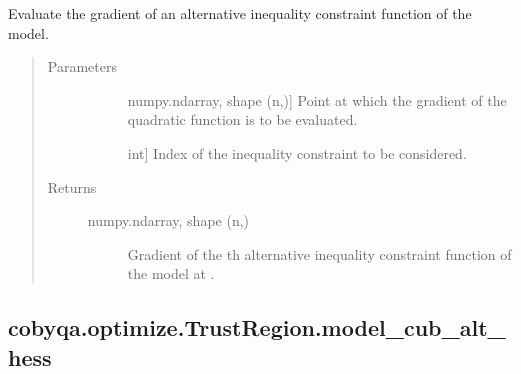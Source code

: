 \documentclass[letterpaper,10pt,english]{sphinxmanual}
\begin{document}
\begin{fulllineitems}
\begin{fulllineitems}
\label{\detokenize{refs/generated/cobyqa.optimize.TrustRegion.model_cub_alt_grad:cobyqa.optimize.TrustRegion.model_cub_alt_grad}}
\sphinxAtStartPar
Evaluate the gradient of an alternative inequality constraint function
of the model.
\begin{quote}\begin{description}
\item[{Parameters}] \leavevmode\begin{description}
\item[{}] \leavevmode{[}numpy.ndarray, shape (n,){]}
\sphinxAtStartPar
Point at which the gradient of the quadratic function is to be
evaluated.

\item[{}] \leavevmode{[}int{]}
\sphinxAtStartPar
Index of the inequality constraint to be considered.

\end{description}

\item[{Returns}] \leavevmode\begin{description}
\item[{numpy.ndarray, shape (n,)}] \leavevmode
\sphinxAtStartPar
Gradient of the \sphinxhyphen{}th alternative inequality constraint function of
the model at .

\end{description}

\end{description}\end{quote}

\end{fulllineitems}



\subsection{cobyqa.optimize.TrustRegion.model\_cub\_alt\_hess}
\label{\detokenize{refs/generated/cobyqa.optimize.TrustRegion.model_cub_alt_hess:cobyqa-optimize-trustregion-model-cub-alt-hess}}\label{\detokenize{refs/generated/cobyqa.optimize.TrustRegion.model_cub_alt_hess::doc}}


\end{fulllineitems}
\end{document}
